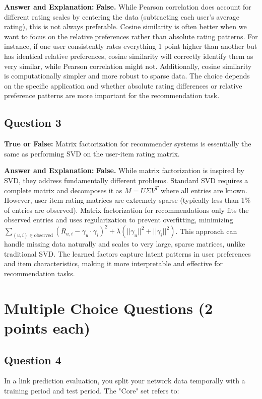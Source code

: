 \documentclass[11pt]{article}
\newenvironment{answer}{\color{answercolor}\begin{framed}\textbf{Answer and Explanation:}}{\end{framed}}
\begin{document}
\begin{answer}
\textbf{False.} While Pearson correlation does account for different rating scales by centering the data (subtracting each user's average rating), this is not always preferable. Cosine similarity is often better when we want to focus on the relative preferences rather than absolute rating patterns. For instance, if one user consistently rates everything 1 point higher than another but has identical relative preferences, cosine similarity will correctly identify them as very similar, while Pearson correlation might not. Additionally, cosine similarity is computationally simpler and more robust to sparse data. The choice depends on the specific application and whether absolute rating differences or relative preference patterns are more important for the recommendation task.
\end{answer}

\subsection{Question 3}
\textbf{True or False:} Matrix factorization for recommender systems is essentially the same as performing SVD on the user-item rating matrix.

\begin{answer}
\textbf{False.} While matrix factorization is inspired by SVD, they address fundamentally different problems. Standard SVD requires a complete matrix and decomposes it as $M = U\Sigma V^T$ where all entries are known. However, user-item rating matrices are extremely sparse (typically less than 1\% of entries are observed). Matrix factorization for recommendations only fits the observed entries and uses regularization to prevent overfitting, minimizing $\sum_{(u,i) \in \text{observed}} (R_{u,i} - \gamma_u \cdot \gamma_i)^2 + \lambda(||\gamma_u||^2 + ||\gamma_i||^2)$. This approach can handle missing data naturally and scales to very large, sparse matrices, unlike traditional SVD. The learned factors capture latent patterns in user preferences and item characteristics, making it more interpretable and effective for recommendation tasks.
\end{answer}

\section{Multiple Choice Questions (2 points each)}

\subsection{Question 4}
In a link prediction evaluation, you split your network data temporally with a training period and test period. The "Core" set refers to:
\end{document}
